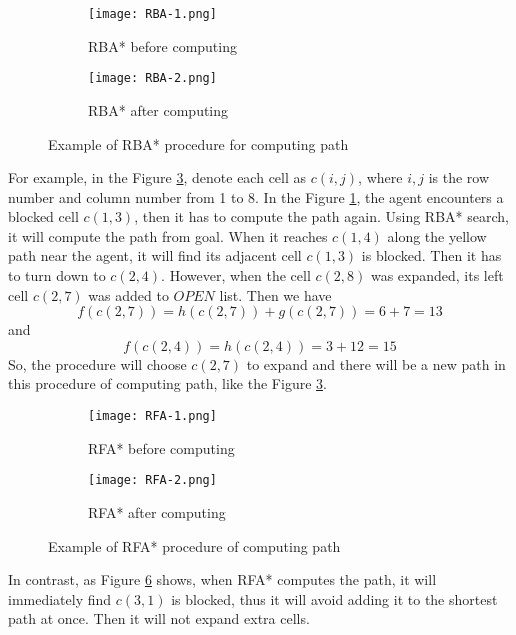 \begin{figure}
  \centering
  \begin{subfigure}[b]{0.45\textwidth}
    \texttt{[image: RBA-1.png]}
    \caption{RBA* before computing}
    \label{fig:p3-rba-1}
  \end{subfigure}
  \begin{subfigure}[b]{0.45\textwidth}
    \texttt{[image: RBA-2.png]}
    \caption{RBA*  after computing}
    \label{fig:p3-rba-2}
  \end{subfigure}
  \caption{Example of RBA* procedure for computing path}
  \label{fig:p3-rba}
\end{figure}

For example, in the Figure \ref{fig:p3-rba}, denote each cell as $c(i,j)$,
where $i,j$ is the row number and column number from 1 to 8. In the Figure
\ref{fig:p3-rba-1}, the agent encounters a blocked cell $c(1,3)$, then it has
to compute the path again. Using RBA* search, it will compute the path from
goal.  When it reaches $c(1,4)$ along the yellow path near the agent, it will
find its adjacent cell $c(1,3)$ is blocked. Then it has to turn down to
$c(2,4)$. However, when the cell $c(2,8)$ was expanded, its left cell $c(2,7)$
was added to $OPEN$ list. Then we have
$$f(c(2,7)) = h(c(2,7)) + g(c(2,7)) = 6 + 7 = 13$$
and
$$f(c(2,4)) = h(c(2,4)) = 3 + 12 =15$$
So, the procedure will choose $c(2,7)$ to expand and there will be a new path in
this procedure of computing path, like the Figure \ref{fig:p3-rba}.

\begin{figure}
  \centering
  \begin{subfigure}[b]{0.45\textwidth}
    \texttt{[image: RFA-1.png]}
    \caption{RFA* before computing}
    \label{fig:p3-rfa-1}
  \end{subfigure}
  \begin{subfigure}[b]{0.45\textwidth}
    \texttt{[image: RFA-2.png]}
    \caption{RFA* after computing}
    \label{fig:p3-rfa-2}
  \end{subfigure}
  \caption{Example of RFA* procedure of computing path}
  \label{fig:p3-rfa}
\end{figure}

In contrast, as Figure \ref{fig:p3-rfa} shows, when RFA* computes the path, it
will immediately find $c(3,1)$ is blocked, thus it will avoid adding it to the
shortest path at once. Then it will not expand extra cells.

